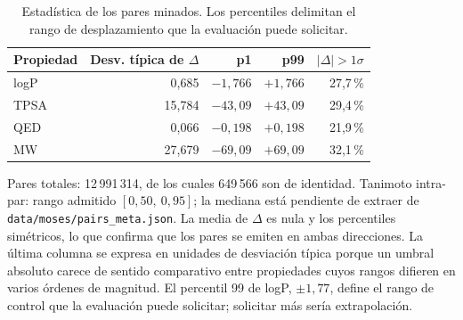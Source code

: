 \begin{table}[htbp]
  \centering
  \caption{Estadística de los pares minados. Los percentiles delimitan el
           rango de desplazamiento que la evaluación puede solicitar.}
  \label{tab:d2-pares}
  \small
  \begin{tabular}{@{}lrrrr@{}}
    \toprule
    Propiedad & Desv. típica de $\Delta$ & p1 & p99 & $|\Delta| > 1\sigma$ \\
    \midrule
    logP & 0,685  & $-1{,}766$ & $+1{,}766$ & 27,7\,\% \\
    TPSA & 15,784 & $-43{,}09$ & $+43{,}09$ & 29,4\,\% \\
    QED  & 0,066  & $-0{,}198$ & $+0{,}198$ & 21,9\,\% \\
    MW   & 27,679 & $-69{,}09$ & $+69{,}09$ & 32,1\,\% \\
    \bottomrule
  \end{tabular}

  \vspace{0.5em}
  \begin{minipage}{0.92\textwidth}
    \footnotesize
    Pares totales: 12\,991\,314, de los cuales 649\,566 son de identidad.
    Tanimoto intra-par: rango admitido $[0{,}50,\ 0{,}95]$; la mediana está pendiente de
    extraer de \texttt{data/moses/pairs\_meta.json}.
    La media de $\Delta$ es nula y los percentiles simétricos, lo que confirma que los
    pares se emiten en ambas direcciones. La última columna se expresa en unidades de
    desviación típica porque un umbral absoluto carece de sentido comparativo entre
    propiedades cuyos rangos difieren en varios órdenes de magnitud.
    El percentil 99 de logP, $\pm 1{,}77$, define el rango de control que la evaluación
    puede solicitar; solicitar más sería extrapolación.
  \end{minipage}
\end{table}
